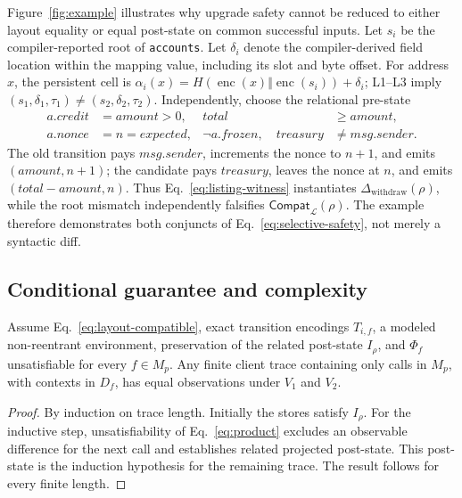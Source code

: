 \documentclass[runningheads]{llncs}
\begin{document}
Figure~\ref{fig:example} illustrates why upgrade safety cannot be reduced to either layout equality or equal post-state on common successful inputs.  Let \(s_i\) be the compiler-reported root of \texttt{accounts}.  Let \(\delta_i\) denote the compiler-derived field location within the mapping value, including its slot and byte offset.  For address \(x\), the persistent cell is \(\alpha_i(x)=H(\operatorname{enc}(x)\Vert\operatorname{enc}(s_i))+\delta_i\); L1--L3 imply \((s_1,\delta_1,\tau_1)\neq(s_2,\delta_2,\tau_2)\).  Independently, choose the relational pre-state
\begin{equation}
\begin{aligned}
a.\mathit{credit}&=\mathit{amount}>0,&
\mathit{total}&\geq\mathit{amount},\\
a.\mathit{nonce}&=n=\mathit{expected},&
\neg a.\mathit{frozen},\quad
\mathit{treasury}&\neq\mathit{msg.sender}.
\end{aligned}
\label{eq:listing-witness}
\end{equation}
The old transition pays \(\mathit{msg.sender}\), increments the nonce to \(n+1\), and emits \((\mathit{amount},n+1)\); the candidate pays \(\mathit{treasury}\), leaves the nonce at \(n\), and emits \((\mathit{total}-\mathit{amount},n)\).  Thus Eq.~\eqref{eq:listing-witness} instantiates \(\Delta_{\mathrm{withdraw}}(\rho)\), while the root mismatch independently falsifies \(\mathsf{Compat}_{\mathcal L}(\rho)\).  The example therefore demonstrates both conjuncts of Eq.~\eqref{eq:selective-safety}, not merely a syntactic diff.

\subsection{Conditional guarantee and complexity}

\begin{theorem}
\label{thm:trace}
Assume Eq.~\eqref{eq:layout-compatible}, exact transition encodings \(T_{i,f}\), a modeled non-reentrant environment, preservation of the related post-state \(I_\rho\), and \(\Phi_f\) unsatisfiable for every \(f\in M_p\).  Any finite client trace containing only calls in \(M_p\), with contexts in \(D_f\), has equal observations under \(V_1\) and \(V_2\).
\end{theorem}

\begin{proof}
By induction on trace length.  Initially the stores satisfy \(I_\rho\). For the inductive step, unsatisfiability of Eq.~\eqref{eq:product} excludes an observable difference for the next call and establishes related projected post-state.  This post-state is the induction hypothesis for the remaining trace.  The result follows for every finite length.
\end{proof}
\end{document}
